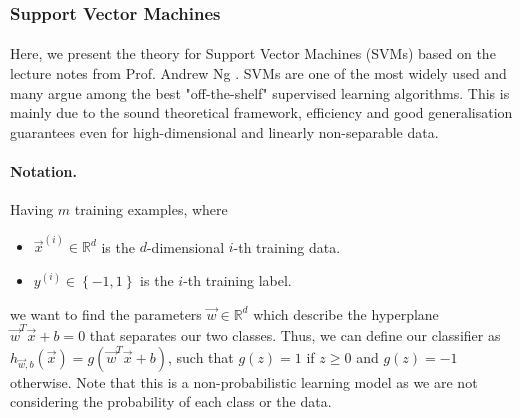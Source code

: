 \subsubsection*{Support Vector Machines}

\paragraph{}
	Here, we present the theory for Support Vector Machines (SVMs) based on the lecture notes from Prof. Andrew Ng \cite{ng13}. SVMs are one of the most widely used and many argue among the best "off-the-shelf" supervised learning algorithms. This is mainly due to the sound theoretical framework, efficiency and good generalisation guarantees even for high-dimensional and linearly non-separable data.
	
\paragraph{Notation.}
	Having $m$ training examples, where
	\begin{itemize}

  		\item $\vec{x}^{(i)} \in \mathbb{R}^d$ is the $d$-dimensional $i$-th training data.
  		\item $y^{(i)} \in \left\{-1, 1 \right\}$ is the $i$-th training label.

	\end{itemize}
we want to find the parameters $\vec{w} \in \mathbb{R}^d$ which describe the hyperplane $\vec{w}^T \vec{x} + b = 0$ that separates our two classes. Thus, we can define our classifier as $h_{\vec{w}, b}(\vec{x}) = g\left(\vec{w}^T \vec{x} + b \right)$, such that $g(z) = 1$ if $z \geq 0$ and $g(z) = -1$ otherwise. Note that this is a non-probabilistic learning model as we are not considering the probability of each class or the data.
	
